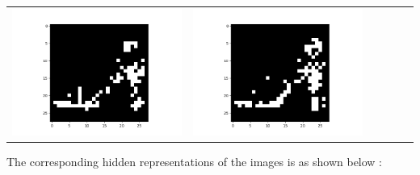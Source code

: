 \documentclass[12pt]{report}
\begin{document}
\begin{table}[H]
\begin{tabular}{  c  c  c  c  c  c }
\begin{minipage}{.15\textwidth}
      \includegraphics[scale=0.2]{BM_f16.png}
    \end{minipage} &
    \begin{minipage}{.15\textwidth}
      \includegraphics[scale=0.2]{BM_f40.png}
    \end{minipage}
  \end{tabular}
\end{table}

The corresponding hidden representations of the images is as shown below :
\end{document}
